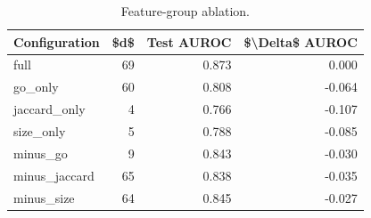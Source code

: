 \begin{table}[htbp]
\centering
\caption{Feature-group ablation.}
\label{tab:ablation_recomputed}
\begin{tabular}{lrrr}
\toprule
Configuration & \$d\$ & Test AUROC & \$\textbackslash Delta\$ AUROC \\
\midrule
full & 69 & 0.873 & 0.000 \\
go\_only & 60 & 0.808 & -0.064 \\
jaccard\_only & 4 & 0.766 & -0.107 \\
size\_only & 5 & 0.788 & -0.085 \\
minus\_go & 9 & 0.843 & -0.030 \\
minus\_jaccard & 65 & 0.838 & -0.035 \\
minus\_size & 64 & 0.845 & -0.027 \\
\bottomrule
\end{tabular}

\end{table}
